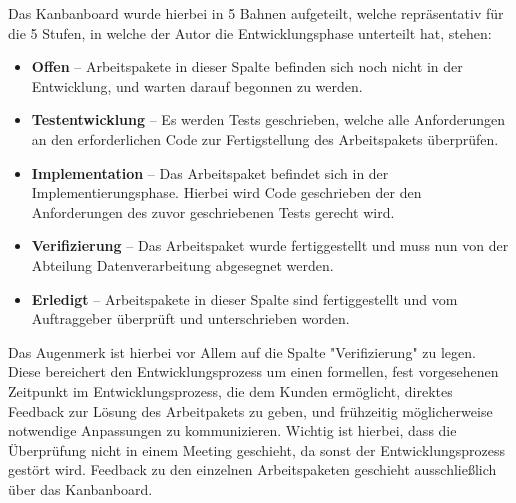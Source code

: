 Das Kanbanboard wurde hierbei in 5 Bahnen aufgeteilt, welche repräsentativ für
die 5 Stufen, in welche der Autor die Entwicklungsphase unterteilt hat, stehen:
\begin{itemize}
    \item \textbf{Offen} -- Arbeitspakete in dieser Spalte befinden sich noch
    nicht in der Entwicklung, und warten darauf begonnen zu werden.
    \item \textbf{Testentwicklung} -- Es werden Tests geschrieben, welche alle
    Anforderungen an den erforderlichen Code zur Fertigstellung des Arbeitspakets
    überprüfen.
    \item \textbf{Implementation} -- Das Arbeitspaket befindet sich in der
    Implementierungsphase. Hierbei wird Code geschrieben der den Anforderungen
    des zuvor geschriebenen Tests gerecht wird.
    \item \textbf{Verifizierung} -- Das Arbeitspaket wurde fertiggestellt und
    muss nun von der Abteilung Datenverarbeitung abgesegnet werden.
    \item \textbf{Erledigt} -- Arbeitspakete in dieser Spalte sind fertiggestellt
    und vom Auftraggeber überprüft und unterschrieben worden.
\end{itemize}

Das Augenmerk ist hierbei vor Allem auf die Spalte "Verifizierung" zu legen.
Diese bereichert den Entwicklungsprozess um einen formellen, fest vorgesehenen
Zeitpunkt im Entwicklungsprozess, die dem Kunden ermöglicht, direktes Feedback
zur Lösung des Arbeitpakets zu geben, und frühzeitig möglicherweise notwendige
Anpassungen zu kommunizieren. Wichtig ist hierbei, dass die Überprüfung nicht in
einem Meeting geschieht, da sonst der Entwicklungsprozess gestört wird. Feedback
zu den einzelnen Arbeitspaketen geschieht ausschließlich über das Kanbanboard.\par

